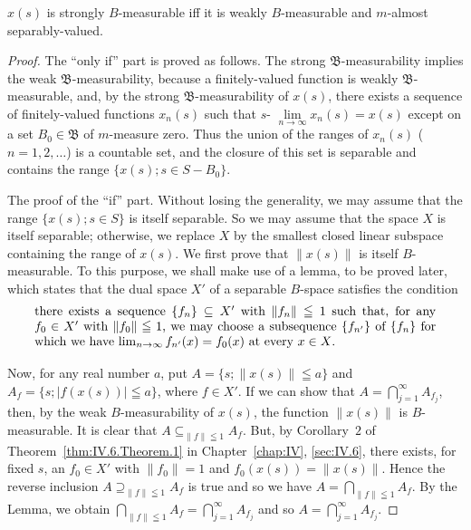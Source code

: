 \begin{theoremn} $x(s)$ is strongly $B$-measurable iff it is weakly $B$-measurable and $m$-almost separably-valued.

\end{theoremn}
\begin{proof}
 The ``only if'' part is proved as follows. The strong $\mathfrak{B}$-measurability implies the weak $\mathfrak{B}$-measurability, because a finitely-valued function is weakly $\mathfrak{B}$-measurable, and, by the strong $\mathfrak{B}$-measurability of $x(s)$, there exists a sequence of finitely-valued functions $x_{n}(s)$ such that $s\text{- }\lim\limits_{n\to\infty}x_{n}(s)=x(s)$ except on a set $B_{0}\in\mathfrak{B}$ of $m$-measure zero. Thus the union of the ranges of $x_{n}(s)$ ( $n=1,2,\ldots$) is a countable set, and the closure of this set is separable and contains the range $\{x(s); s\in S-B_{0}\}$. 

The proof of the ``if'' part. Without losing the generality, we may assume that the range $\{x(s); s \in S\}$ is itself separable. So we may assume that the space $X$ is itself separable; otherwise, we replace $X$ by the smallest closed linear subspace containing the range of $x(s)$. We first prove that $\|x(s)\|$ is itself $B$-measurable. To this purpose, we shall make use of a lemma, to be proved later, which states that the dual space $X'$ of a separable $B$-space satisfies the condition 
\begin{equation}\label{eq:V.4.1}
\begin{minipage}[b]{0.92\linewidth}
there exists a sequence $\{f_n\} \subseteq X'$ with $\|f_n\| \leqq 1$ such that, for any $f_0 \in X'$ with $\|f_0\| \leqq 1$, we may choose a subsequence $\{f_{n'}\}$ of $\{f_n\}$ for which we have $\lim\limits_{n \to \infty} f_{n'}(x) = f_0(x)$ at every $x \in X$.
\end{minipage}
\end{equation}


Now, for any real number $a$, put 
$A = \{s; \|x(s)\| \leqq a\}$ and $A_f = \{s; |f(x(s))| \leqq a\}$, where $f \in X'$. If we can show that $A = \bigcap\limits_{j=1}^{\infty} A_{f_{j}}$, then, by the weak $B$-measurability of $x(s)$, the function $\|x(s)\|$ is $B$-measurable. It is clear that $A \subseteq_{\|f\| \leqq 1} A_f$. But, by Corollary~\hyperref[cor:IV.6.Corollary.2]{$2$} of Theorem~\ref{thm:IV.6.Theorem.1} in Chapter~\ref{chap:IV}, \ref{sec:IV.6}, there exists, for fixed $s$, an $f_0 \in X'$ with $\|f_0\| = 1$ and $f_0(x(s)) = \|x(s)\|$. Hence the reverse inclusion $A \supseteq_{\|f\| \leqq 1} A_f$ is true and so we have $A = \bigcap\limits_{\|f\| \leqq 1} A_f$. By the Lemma, we obtain $\bigcap\limits_{\|f\| \leqq 1} A_f = \bigcap\limits_{j=1}^{\infty} A_{f_{j}}$ and so $A = \bigcap\limits_{j=1}^{\infty} A_{f_{j}}$. 


\end{proof}
